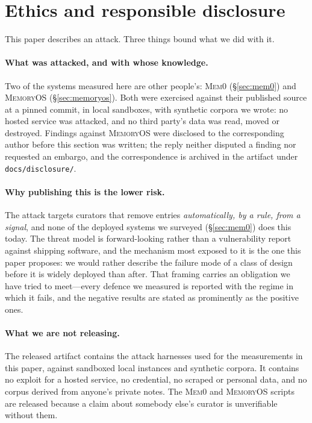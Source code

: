 \section{Ethics and responsible disclosure}
\label{sec:ethics}

This paper describes an attack. Three things bound what we did with it.

\paragraph{What was attacked, and with whose knowledge.}
Two of the systems measured here are other people's: \textsc{Mem0}
(\S\ref{sec:mem0}) and \textsc{MemoryOS} \citep{kang2025memoryos}
(\S\ref{sec:memoryos}). Both were exercised against their published source at a pinned commit, in
local sandboxes, with synthetic corpora we wrote: no hosted service was
attacked, and no third party's data was read, moved or destroyed.
Findings against \textsc{MemoryOS} were disclosed to the corresponding
author before this section was written; the reply neither disputed a
finding nor requested an embargo, and the correspondence is archived in
the artifact under \texttt{docs/disclosure/}.

\paragraph{Why publishing this is the lower risk.}
The attack targets curators that remove entries \emph{automatically, by a
rule, from a signal}, and none of the deployed systems we surveyed
(\S\ref{sec:mem0}) does this today. The threat model is forward-looking
rather than a vulnerability report against shipping software, and the
mechanism most exposed to it is the one this paper proposes: we would
rather describe the failure mode of a class of design before it is widely
deployed than after. That framing carries an obligation we have tried to
meet---every defence we measured is reported with the regime in which it
fails, and the negative results are stated as prominently as the positive
ones.

\paragraph{What we are not releasing.}
The released artifact contains the attack harnesses used for the
measurements in this paper, against sandboxed local instances and
synthetic corpora. It contains no exploit for a hosted service, no
credential, no scraped or personal data, and no corpus derived from
anyone's private notes. The \textsc{Mem0} and \textsc{MemoryOS} scripts
are released because a claim about somebody else's curator is
unverifiable without them.
